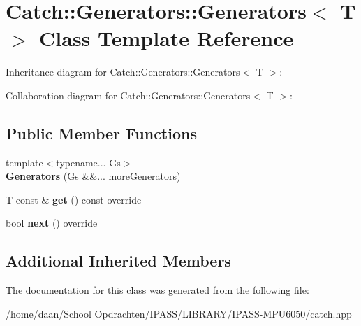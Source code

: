 \hypertarget{classCatch_1_1Generators_1_1Generators}{}\section{Catch\+:\+:Generators\+:\+:Generators$<$ T $>$ Class Template Reference}
\label{classCatch_1_1Generators_1_1Generators}


Inheritance diagram for Catch\+:\+:Generators\+:\+:Generators$<$ T $>$\+:


Collaboration diagram for Catch\+:\+:Generators\+:\+:Generators$<$ T $>$\+:
\subsection*{Public Member Functions}
\begin{DoxyCompactItemize}
\item 
\mbox{\label{classCatch_1_1Generators_1_1Generators_a2bcb50c42a8729cbac079b3b61699a61}} 
{\footnotesize template$<$typename... Gs$>$ }\\{\bfseries Generators} (Gs \&\&... more\+Generators)
\item 
\mbox{\label{classCatch_1_1Generators_1_1Generators_a66705482b7efa88cae6e6b7062d5de6a}} 
T const  \& {\bfseries get} () const override
\item 
\mbox{\label{classCatch_1_1Generators_1_1Generators_ad127fd2a07347b527f79ab3b78bd40fb}} 
bool {\bfseries next} () override
\end{DoxyCompactItemize}
\subsection*{Additional Inherited Members}


The documentation for this class was generated from the following file\+:\begin{DoxyCompactItemize}
\item 
/home/daan/\+School Opdrachten/\+I\+P\+A\+S\+S/\+L\+I\+B\+R\+A\+R\+Y/\+I\+P\+A\+S\+S-\/\+M\+P\+U6050/catch.\+hpp\end{DoxyCompactItemize}
